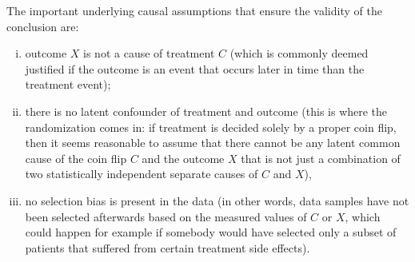 \documentclass[twoside,11pt]{article}
\begin{document}
The important underlying causal assumptions that ensure the validity of the
conclusion are:
\begin{enumerate}[(i)]
  \item outcome $X$ is not a cause of treatment $C$ (which is commonly deemed 
  justified if the outcome is an event that occurs later in time than the treatment event);
  \item there is no latent confounder of treatment and outcome (this is where the 
randomization comes in: if treatment is decided solely by a proper coin flip, 
then it seems reasonable to assume that there cannot be any latent common cause 
of the coin flip $C$ and the outcome $X$ that is not just a combination of two
statistically independent separate causes of $C$ and $X$), 
\item no selection bias is present in the data (in other words, data 
samples have not been selected afterwards based on the measured values of $C$ or $X$,
which could happen for example if somebody would have selected only a subset of 
patients that suffered from certain treatment side effects).
\end{enumerate}
\end{document}
